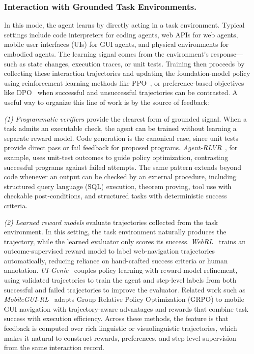 \subsubsection{Interaction with Grounded Task Environments.}
\label{sec:Grounded_Interaction_with_Verifiable_Environments}
\label{sec:Environment_Interactive}

In this mode, the agent learns by directly acting in a task environment. Typical settings include code interpreters for coding agents, web APIs for web agents, mobile user interfaces (UIs) for GUI agents, and physical environments for embodied agents. The learning signal comes from the environment's response—such as state changes, execution traces, or unit tests. Training then proceeds by collecting these interaction trajectories and updating the foundation-model policy using reinforcement learning methods like PPO~\citep{schulman2017proximal}, or preference-based objectives like DPO~\citep{rafailov2023direct} when successful and unsuccessful trajectories can be contrasted. A useful way to organize this line of work is by the source of feedback:



\textit{(1) Programmatic verifiers} provide the clearest form of grounded signal. When a task admits an executable check, the agent can be trained without learning a separate reward model. Code generation is the canonical case, since unit tests provide direct pass or fail feedback for proposed programs. \textit{Agent-RLVR}~\citep{da2025agent}, for example, uses unit-test outcomes to  guide policy optimization, contrasting successful programs against failed attempts. The same pattern extends beyond code whenever an output can be checked by an external procedure, including structured query language (SQL) execution, theorem proving, tool use with checkable post-conditions, and structured tasks with deterministic success criteria.


\textit{(2) Learned reward models} evaluate trajectories collected from the task environment. In this setting, the task environment naturally produces the trajectory, while the learned evaluator only scores its success. \textit{WebRL}~\citep{qi2025webrl} trains an outcome-supervised reward model to label web-navigation trajectories automatically, reducing reliance on hand-crafted success criteria or human annotation. \textit{UI-Genie}~\citep{xiao2025uigenie} couples policy learning with reward-model refinement, using validated trajectories to train the agent and step-level labels from both successful and failed trajectories to improve the evaluator. Related work such as \textit{MobileGUI-RL}~\citep{shi2025mobilegui} adapts Group Relative Policy Optimization (GRPO) to mobile GUI navigation with trajectory-aware advantages and rewards that combine task success with execution efficiency. Across these methods, the feature is that feedback is computed over rich linguistic or visuolinguistic trajectories, which makes it natural to construct rewards, preferences, and step-level supervision from the same interaction record.

